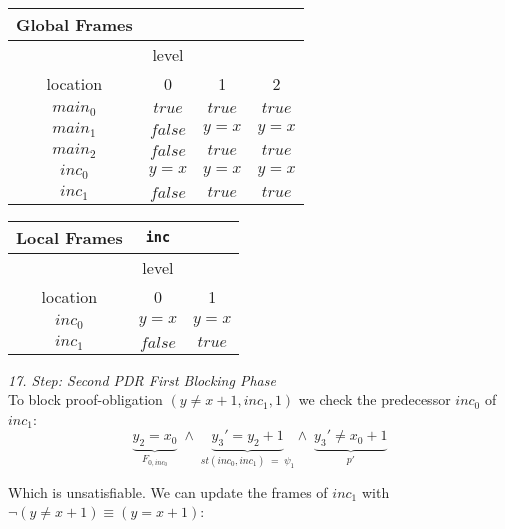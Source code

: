 \documentclass{article}
\begin{document}
\begin{minipage}{.4\textwidth}
	\setlength\tabcolsep{0.35em}
	\begin{center}
		\begin{tabu}{cccc}
			Global Frames \\
			\toprule
			& level \\
			\cmidrule(lr){2-2}
			location & 0 & 1 & 2 \\
			$main_0$ & $true$ & $true$ & $true$  \\
			$main_1$ & $false$ & $y = x$ & $y = x$\\
			$main_2$ & $false$ & $true$ & $true$ \\
			$inc_0$ & $y = x$ & $y = x$ & $y = x$ \\
			$inc_1$ & $false$ & $true$ & $true$\\
			\bottomrule
		\end{tabu}
	\end{center}
\end{minipage}
\hfill
\begin{minipage}{.5\textwidth}
	\setlength\tabcolsep{0.35em}
	\begin{center}
		\begin{tabu}{ccc}
			Local Frames & \texttt{inc}\\
			\toprule
			& level \\
			\cmidrule(lr){2-3}
			location & 0 & 1  \\
			$inc_0$ & $y = x$ & $y = x$  \\
			$inc_1$ & $false$ & $true$ \\
			\bottomrule
		\end{tabu}
	\end{center}	
\end{minipage}

\vspace*{1em}

\textsl{17. Step: Second PDR First Blocking Phase} \\
To block proof-obligation $(y \neq x + 1, inc_1, 1)$ we check the predecessor $inc_0$ of $inc_1$: \\
\begin{equation*}
\underbrace{y_2 = x_0}_{F_{0, inc_0}}\; \land \; \underbrace{y_3' = y_2 + 1}_{st(inc_0, inc_1)\; = \; \psi_1} \land \; \underbrace{y_3' \neq x_0 + 1}_{p'}
\end{equation*}

Which is unsatisfiable. We can update the frames of $inc_1$ with $\neg(y \neq x + 1) \equiv (y = x + 1)$: \\ \\
\end{document}
